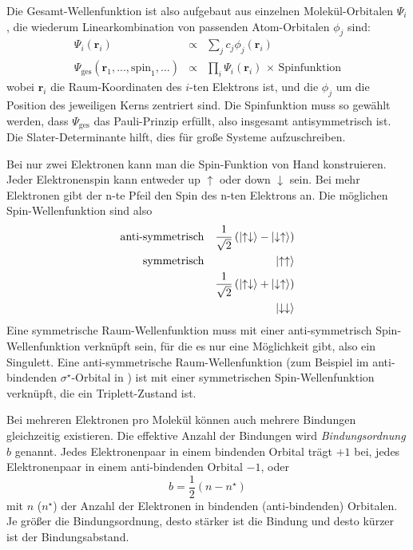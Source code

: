 Die Gesamt-Wellenfunktion ist also aufgebaut aus einzelnen Molekül-Orbitalen $\Psi_i$, die wiederum Linearkombination von passenden Atom-Orbitalen $\phi_j$ sind:
\begin{eqnarray}
 \Psi_i(\mathbf{r}_i) & \propto &  \sum_j c_j \phi_j(\mathbf{r}_i) \\
  \Psi_\text{ges}(\mathbf{r}_1, ..., \text{spin}_1, ...)  & \propto & \prod_i \Psi_i(\mathbf{r}_i) \, \times \, \text{Spinfunktion}
\end{eqnarray}
wobei $\mathbf{r}_i$ die Raum-Koordinaten des $i$-ten Elektrons ist, und die $\phi_j$ um die Position des jeweiligen Kerns zentriert sind. Die Spinfunktion muss so gewählt werden, dass $ \Psi_\text{ges}$ das Pauli-Prinzip erfüllt, also insgesamt antisymmetrisch ist. Die Slater-Determinante hilft, dies für große Systeme aufzuschreiben.

Bei nur zwei Elektronen kann man die Spin-Funktion von Hand konstruieren. Jeder Elektronenspin kann entweder up $\uparrow$ oder down $\downarrow$ sein. Bei mehr Elektronen gibt der n-te Pfeil den Spin des n-ten Elektrons an.  Die möglichen Spin-Wellenfunktion sind also 
\begin{eqnarray}
\text{anti-symmetrisch} &  & \frac{1}{\sqrt{2}} \left( \ket{\uparrow \downarrow} - \ket{\downarrow \uparrow} \right) \\
\text{symmetrisch} &  &\ket{\uparrow \uparrow}  \\
& &\frac{1}{\sqrt{2}} \left( \ket{\uparrow \downarrow} + \ket{\downarrow \uparrow} \right) \\
& &\ket{\downarrow \downarrow}  
\end{eqnarray}
Eine symmetrische Raum-Wellenfunktion muss mit einer anti-symmetrisch Spin-Wellenfunktion verknüpft sein, für die es nur eine Möglichkeit gibt, also ein Singulett. Eine anti-symmetrische Raum-Wellenfunktion (zum Beispiel im anti-bindenden $\sigma^\star$-Orbital in ) ist mit einer symmetrischen Spin-Wellenfunktion verknüpft, die ein Triplett-Zustand ist.

Bei mehreren Elektronen pro Molekül können auch mehrere Bindungen gleichzeitig existieren. Die effektive Anzahl der Bindungen wird \textit{Bindungsordnung} $b$ genannt. Jedes Elektronenpaar in einem bindenden Orbital trägt $+1$ bei, jedes Elektronenpaar in einem anti-bindenden Orbital $-1$, oder
\begin{equation}
  b = \frac{1}{2} \left( n - n^\star \right)
\end{equation}
mit $n$ ($n^\star$) der Anzahl der Elektronen in bindenden (anti-bindenden) Orbitalen. Je größer die Bindungsordnung, desto stärker ist die Bindung und desto kürzer ist der Bindungsabstand.

